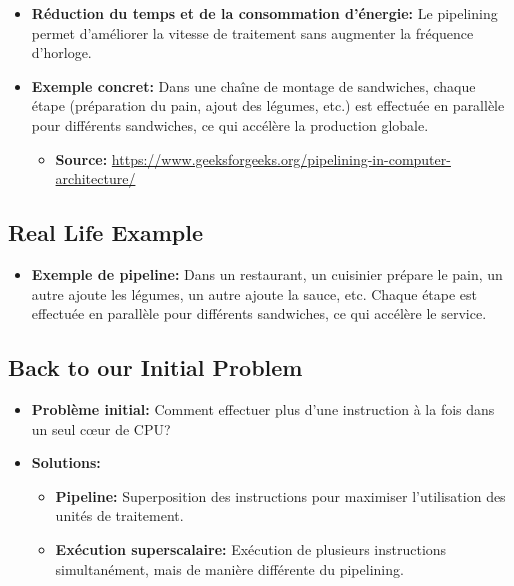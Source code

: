 \documentclass[10pt,a4paper]{article}
\begin{document}
\begin{itemize}
    \item \textbf{Réduction du temps et de la consommation d'énergie:} Le pipelining permet d'améliorer la vitesse de traitement sans augmenter la fréquence d'horloge.
    \item \textbf{Exemple concret:} Dans une chaîne de montage de sandwiches, chaque étape (préparation du pain, ajout des légumes, etc.) est effectuée en parallèle pour différents sandwiches, ce qui accélère la production globale.
    \begin{itemize}
        \item \textbf{Source:} \url{https://www.geeksforgeeks.org/pipelining-in-computer-architecture/}
    \end{itemize}
\end{itemize}

\subsection*{Real Life Example}

\begin{itemize}
    \item \textbf{Exemple de pipeline:} Dans un restaurant, un cuisinier prépare le pain, un autre ajoute les légumes, un autre ajoute la sauce, etc. Chaque étape est effectuée en parallèle pour différents sandwiches, ce qui accélère le service.
\end{itemize}

\subsection*{Back to our Initial Problem}

\begin{itemize}
    \item \textbf{Problème initial:} Comment effectuer plus d'une instruction à la fois dans un seul cœur de CPU?
    \item \textbf{Solutions:}
    \begin{itemize}
        \item \textbf{Pipeline:} Superposition des instructions pour maximiser l'utilisation des unités de traitement.
        \item \textbf{Exécution superscalaire:} Exécution de plusieurs instructions simultanément, mais de manière différente du pipelining.
    \end{itemize}
\end{itemize}
\end{document}

